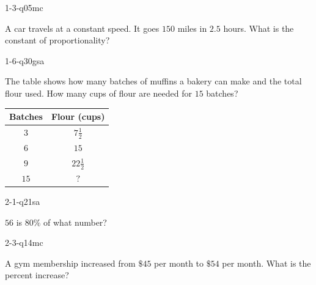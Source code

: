 
\begin{practiceQuestion}{1-3-q05}{mc}
\begin{questionText}
A car travels at a constant speed. It goes $150$ miles in $2.5$ hours. What is the constant of proportionality?
\end{questionText}
\end{practiceQuestion}

\begin{practiceQuestion}{1-6-q30}{gsa}
\begin{questionText}
The table shows how many batches of muffins a bakery can make and the total flour used. How many cups of flour are needed for $15$ batches?

\begin{center}
\begin{tabular}{|c|c|}
\hline
\textbf{Batches} & \textbf{Flour (cups)} \\ \hline
$3$ & $7\frac{1}{2}$ \\ \hline
$6$ & $15$ \\ \hline
$9$ & $22\frac{1}{2}$ \\ \hline
$15$ & $?$ \\ \hline
\end{tabular}
\end{center}
\end{questionText}
\end{practiceQuestion}

\begin{practiceQuestion}{2-1-q21}{sa}
\begin{questionText}
$56$ is $80\%$ of what number?
\end{questionText}
\end{practiceQuestion}

\begin{practiceQuestion}{2-3-q14}{mc}
\begin{questionText}
A gym membership increased from $\$45$ per month to $\$54$ per month. What is the percent increase?


\end{questionText}
\end{practiceQuestion}

